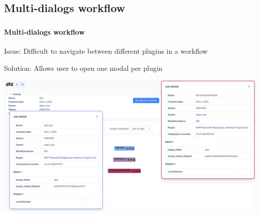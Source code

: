 \def\slidetitle{Multi-dialogs workflow}

\subsection{\slidetitle}
\begin{frame}
  \frametitle{\sectiontitle}
  \framesubtitle{\slidetitle}

  Issue: Difficult to navigate between different plugins in a workflow

  Solution: Allows user to open one modal per plugin

  \begin{minipage}[h!]{1.0\textwidth}
    \centerline{\includegraphics[scale=0.185]{./img/multi_modals.png}}
  \end{minipage}\hfill
\end{frame}
